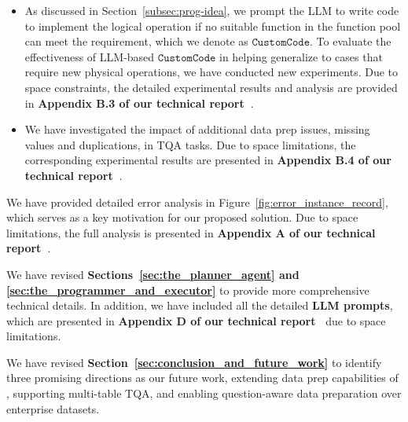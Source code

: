 \begin{itemize}[leftmargin=15pt]
	\item[(6)] As discussed in Section~\ref{subsec:prog-idea}, we prompt the LLM to write code to implement the logical operation if no suitable function in the function pool can meet the requirement, which we denote as $\mathtt{CustomCode}$.
	To evaluate the effectiveness of LLM-based $\mathtt{CustomCode}$ in helping \sys generalize to cases that require new physical operations, we have conducted new experiments. Due to space constraints, the detailed experimental results and analysis are provided in \textbf{Appendix B.3 of our technical report~\cite{technical_report}}.
    \item[(7)] We have investigated the impact of additional data prep issues, \ie missing values and duplications, in TQA tasks. Due to space limitations, the corresponding experimental results are presented in \textbf{Appendix B.4 of our technical report~\cite{technical_report}}.
\end{itemize} 

We have provided detailed error analysis in Figure~\ref{fig:error_instance_record}, which serves as a key motivation for our proposed solution. Due to space limitations, the full analysis is presented in \textbf{Appendix A of our technical report~\cite{technical_report}}.

We have revised \textbf{Sections~\ref{sec:the_planner_agent} and \ref{sec:the_programmer_and_executor}} to provide more comprehensive technical details. In addition, we have included all the detailed \textbf{LLM prompts}, which are presented in \textbf{Appendix D of our technical report~\cite{technical_report}} due to space limitations.

We have revised \textbf{Section~\ref{sec:conclusion_and_future_work}} to identify three promising directions as our future work, \ie extending data prep capabilities of \sys,  supporting multi-table TQA, and enabling question-aware data preparation over enterprise datasets.